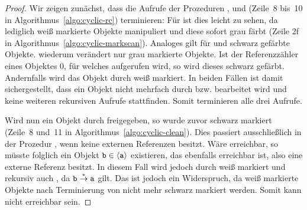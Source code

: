 \begin{proof}
	Wir zeigen zunächst, dass die Aufrufe der Prozeduren ,  und  (Zeile~8 bis~10 in Algorithmus~\ref{algo:cyclic-rc}) terminieren:
	Für  ist dies leicht zu sehen, da  lediglich weiß markierte Objekte manipuliert und diese sofort grau färbt (Zeile 2f in Algorithmus~\ref{algo:cyclic-markscan}).
	Analoges gilt für  und schwarz gefärbte Objekte.
	 wiederum verändert nur grau markierte Objekte.
	Ist der Referenzzähler eines Objektes $0$, für welches  aufgerufen wird, so wird dieses schwarz gefärbt.
	Andernfalls wird das Objekt durch  weiß markiert.
	In beiden Fällen ist damit sichergestellt, dass ein Objekt nicht mehrfach durch  bzw.  bearbeitet wird und keine weiteren rekursiven Aufrufe stattfinden.
	Somit terminieren alle drei Aufrufe.
	
	Wird nun ein Objekt  durch  freigegeben, so wurde  zuvor schwarz markiert (Zeile~8 und~11 in Algorithmus~\ref{algo:cyclic-clean}).
	Dies passiert ausschließlich in der Prozedur , wenn  keine externen Referenzen besitzt.
	Wäre  erreichbar, so müsste folglich ein Objekt $\texttt{b} \in \left\langle\texttt{a}\right\rangle$ existieren, das ebenfalls erreichbar ist, also eine externe Referenz besitzt.
	In diesem Fall wird  jedoch durch  weiß markiert und rekursiv auch , da $\texttt{b} \overset{*}{\rightarrow} \texttt{a}$ gilt.
	Das ist jedoch ein Widerspruch, da weiß markierte Objekte nach Terminierung von  nicht mehr schwarz markiert werden.
	Somit kann  nicht erreichbar sein.
\end{proof}

